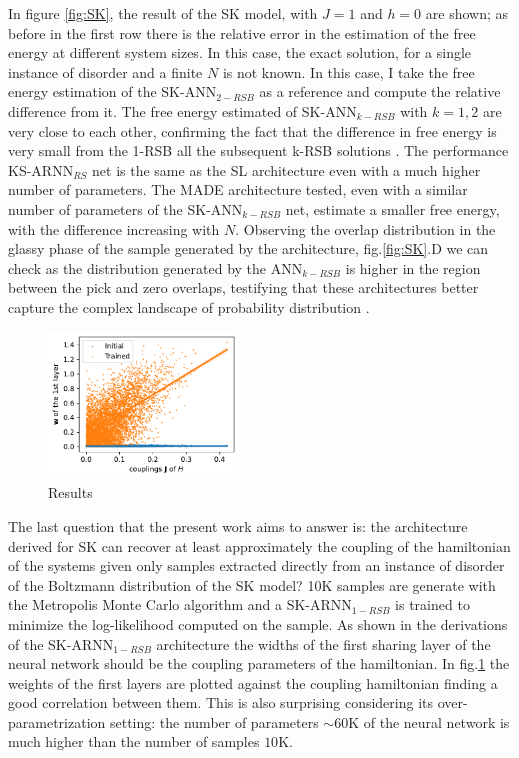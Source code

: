 \documentclass[aps,physrev,10pt,floatfix,reprint]{revtex4-2}
\begin{document}
In figure \ref{fig:SK}, the result of the SK model, with $J=1$ and $h=0$ are shown; as before in the first row there is the relative error in the estimation of the free energy at different system sizes. In this case, the exact solution, for a single instance of disorder and a finite $N$ is not known. In this case, I take the free energy estimation of the SK-ANN$_{2-RSB}$ as a reference and compute the relative difference from it. The free energy estimated of SK-ANN$_{k-RSB}$ with $k=1,2$ are very close to each other, confirming the fact that the difference in free energy is very small from the 1-RSB all the subsequent k-RSB solutions \cite{Parisi_1980}. The performance KS-ARNN$_{RS}$ net is the same as the SL architecture even with a much higher number of parameters. The MADE architecture tested, even with a similar number of parameters of the SK-ANN$_{k-RSB}$ net, estimate a smaller free energy, with the difference increasing with $N$. Observing the overlap distribution in the glassy phase of the sample generated by the architecture, fig.\ref{fig:SK}.D we can check as the distribution generated by the ANN$_{k-RSB}$ is higher in the region between the pick and zero overlaps,  testifying that these architectures better capture the complex landscape of probability distribution \cite{PhysRevLett.51.1206}.

\begin{figure}[]
    \centering 
    \includegraphics[width=0.45\textwidth]{img/MC_img.pdf}
    \caption{Results}
    \label{fig:SK_MC}
\end{figure}

The last question that the present work aims to answer is: the architecture derived for SK can recover at least approximately the coupling of the hamiltonian of the systems given only samples extracted directly from an instance of disorder of the Boltzmann distribution of the SK model? 10K samples are generate with the Metropolis Monte Carlo algorithm and a SK-ARNN$_{1-RSB}$ is trained to minimize the log-likelihood computed on the sample. As shown in the derivations of the SK-ARNN$_{1-RSB}$ architecture the widths of the first sharing layer of the neural network should be the coupling parameters of the hamiltonian. In fig.\ref{fig:SK_MC} the weights of the first layers are plotted against the coupling hamiltonian finding a good correlation between them. This is also surprising considering its over-parametrization setting: the number of parameters $\sim 60$K of the neural network is much higher than the number of samples $10$K.


%

%

\end{document}
